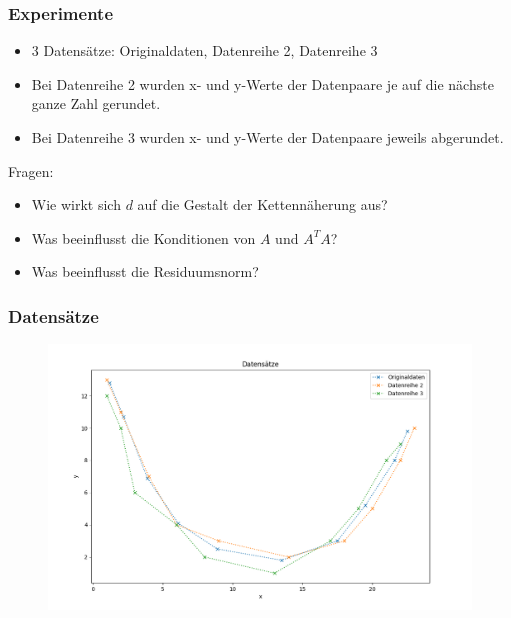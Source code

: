 \documentclass[a4paper, 11pt]{beamer}
\begin{document}
\begin{frame}
    \frametitle{Experimente}

    \begin{itemize}
        \item 3 Datensätze: Originaldaten, Datenreihe 2, Datenreihe 3
        \item Bei Datenreihe 2 wurden x- und y-Werte der Datenpaare je auf die nächste ganze Zahl gerundet.
        \item Bei Datenreihe 3 wurden x- und y-Werte der Datenpaare jeweils abgerundet.
    \end{itemize}
    \vspace{0.25cm}
    Fragen:
    \begin{itemize}
        \item Wie wirkt sich $d$ auf die Gestalt der Kettennäherung aus?
        \item Was beeinflusst die Konditionen von $A$ und $A^T A$?
        \item Was beeinflusst die Residuumsnorm?
    \end{itemize}
\end{frame}

\begin{frame}
    \frametitle{Datensätze}

    \begin{figure}
        \includegraphics[scale=0.4]{datensaetze}
    \end{figure}
\end{frame}
\end{document}
